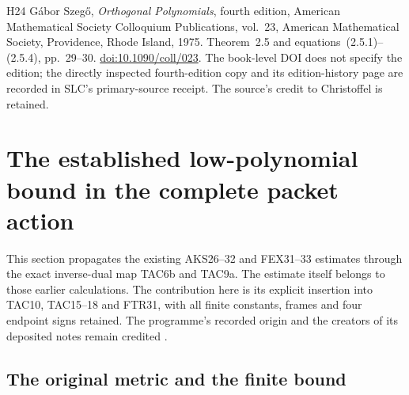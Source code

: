 \documentclass[11pt,a4paper]{article}
\begin{document}
\begin{thebibliography}{H24}
G\'abor Szeg\H{o}, \emph{Orthogonal Polynomials},
fourth edition, American Mathematical Society Colloquium Publications,
vol.~23, American Mathematical Society, Providence, Rhode Island, 1975.
Theorem~2.5 and equations~(2.5.1)--(2.5.4), pp.~29--30.
\href{https://doi.org/10.1090/coll/023}{doi:10.1090/coll/023}.
The book-level DOI does not specify the edition; the directly inspected
fourth-edition copy and its edition-history page are recorded in SLC's
primary-source receipt. The source's credit to Christoffel is retained.


\end{thebibliography}

\label{MTBUILD:NEW_HUMAN_REFERENCES:end}



\clearpage
\begingroup
\section{The established low-polynomial bound in the complete packet action}
\label{sec:LRP}

This section propagates the existing AKS26--32 and FEX31--33 estimates
through the exact inverse-dual map TAC6b and TAC9a. The estimate itself
belongs to those earlier calculations. The contribution here is its
explicit insertion into TAC10, TAC15--18 and FTR31, with all finite
constants, frames and four endpoint signs retained. The programme's
recorded origin and the creators of its deposited notes remain credited
\cite{human:globalization2026,human:splitzero2026}.

\subsection{The original metric and the finite bound}
\end{document}
